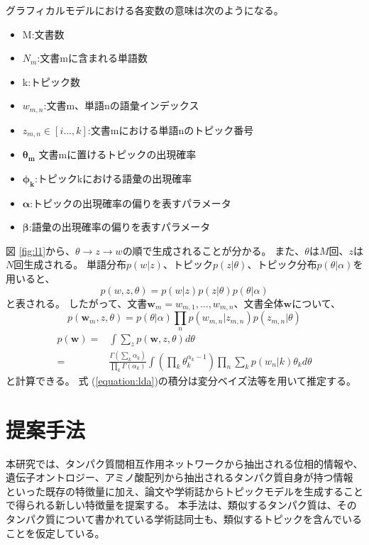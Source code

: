 \documentclass[titlepage,12pt]{jreport}
\begin{document}
グラフィカルモデルにおける各変数の意味は次のようになる。
\begin{screen}
\begin{itemize}
\item M:文書数
\item $N_{m}$:文書mに含まれる単語数
\item k:トピック数
\item $w_{m,n}$:文書m、単語nの語彙インデックス
\item $z_{m,n}\in [i...,k]$:文書mにおける単語nのトピック番号
\item $\bm{\theta_{m}}$ 文書mに置けるトピックの出現確率
\item $\bm{\phi_{k}}$:トピックkにおける語彙の出現確率
\item $\bm{\alpha}$:トピックの出現確率の偏りを表すパラメータ
\item $\bm{\beta}$:語彙の出現確率の偏りを表すパラメータ
\end{itemize}
\end{screen}
図 \ref{fig:l1}から、$\theta \rightarrow z \rightarrow w$の順で生成されることが分かる。 また、$\theta$は$M$回、$z$は$N$回生成される。 単語分布$p(w|z)$、トピック$p(z|\theta)$、トピック分布$p(\theta|\alpha)$を用いると、
\begin{equation}
p(w,z,\theta) = p(w|z)p(z|\theta)p(\theta|\alpha)
\end{equation}
と表される。 したがって、文書$\bm{w}_{m} = {w_{m,1},...,w_{m,n}}$、文書全体$\bm{w}$について、
\begin{equation}
p(\bm{w}_{m},z,\theta) = p(\theta|\alpha)\prod_{n}p(w_{m,n}|z_{m,n})p(z_{m,n}|\theta)
\label{equation:topicmodel}
\end{equation}
\begin{equation}
\begin{split}
p(\bm{w}) = 
&\int \sum_{z}p(\bm{w},z,\theta) d\theta\\
=&\frac{\Gamma(\sum_{k}\alpha_{k})}{\prod_{k}\Gamma(\alpha_{k})}\int (\prod_{k}\theta_{k}^{\alpha_{k}-1})\prod_{n}\sum_{k}p(w_{n}|k)\theta_{k}d\theta
\end{split}
\label{equation:lda}
\end{equation}
と計算できる。 式 (\ref{equation:lda})の積分は変分ベイズ法等を用いて推定する。

\section{提案手法\label{sec:proposed-method}}
本研究では、タンパク質間相互作用ネットワークから抽出される位相的情報や、遺伝子オントロジー、アミノ酸配列から抽出されるタンパク質自身が持つ情報%
といった既存の特徴量に加え、論文や学術誌からトピックモデルを生成することで得られる新しい特徴量を提案する。 本手法は、類似するタンパク質は、そのタンパク質について書かれている学術誌同士も、類似するトピックを含んでいることを仮定している。
\end{document}
